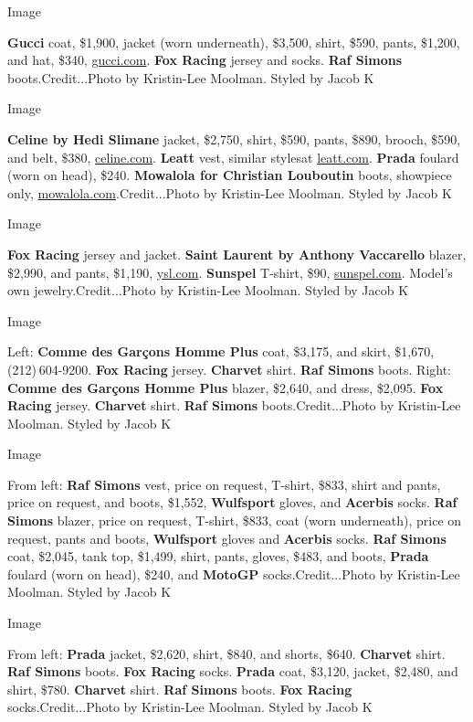 Image

\textbf{Gucci} coat, \$1,900, jacket (worn underneath), \$3,500, shirt,
\$590, pants, \$1,200, and hat, \$340,
\href{http://gucci.com/}{gucci.com}. \textbf{Fox Racing} jersey and
socks. \textbf{Raf Simons} boots.Credit...Photo by Kristin-Lee Moolman.
Styled by Jacob K

Image

\textbf{Celine by Hedi Slimane} jacket, \$2,750, shirt, \$590, pants,
\$890, brooch, \$590, and belt, \$380,
\href{http://celine.com/}{celine.com}. \textbf{Leatt} vest, similar
stylesat \href{http://leatt.com/}{leatt.com}. \textbf{Prada} foulard
(worn on head), \$240. \textbf{Mowalola for Christian Louboutin} boots,
showpiece only, \href{http://mowalola.com/}{mowalola.com}.Credit...Photo
by Kristin-Lee Moolman. Styled by Jacob K

Image

\textbf{Fox Racing} jersey and jacket. \textbf{Saint Laurent by Anthony
Vaccarello} blazer, \$2,990, and pants, \$1,190,
\href{http://ysl.com/}{ysl.com}. \textbf{Sunspel} T-shirt, \$90,
\href{http://sunspel.com/}{sunspel.com}. Model's own
jewelry.Credit...Photo by Kristin-Lee Moolman. Styled by Jacob K

Image

Left: \textbf{Comme des Garçons Homme Plus} coat, \$3,175, and skirt,
\$1,670, (212) 604-9200. \textbf{Fox Racing} jersey. \textbf{Charvet}
shirt. \textbf{Raf Simons} boots. Right: \textbf{Comme des Garçons Homme
Plus} blazer, \$2,640, and dress, \$2,095. \textbf{Fox Racing} jersey.
\textbf{Charvet} shirt. \textbf{Raf Simons} boots.Credit...Photo by
Kristin-Lee Moolman. Styled by Jacob K

Image

From left: \textbf{Raf Simons} vest, price on request, T-shirt, \$833,
shirt and pants, price on request, and boots, \$1,552,
\textbf{Wulfsport} gloves, and \textbf{Acerbis} socks. \textbf{Raf
Simons} blazer, price on request, T-shirt, \$833, coat (worn
underneath), price on request, pants and boots, \textbf{Wulfsport}
gloves and \textbf{Acerbis} socks. \textbf{Raf Simons} coat, \$2,045,
tank top, \$1,499, shirt, pants, gloves, \$483, and boots,
\textbf{Prada} foulard (worn on head), \$240, and \textbf{MotoGP}
socks.Credit...Photo by Kristin-Lee Moolman. Styled by Jacob K

Image

From left: \textbf{Prada} jacket, \$2,620, shirt, \$840, and shorts,
\$640. \textbf{Charvet} shirt. \textbf{Raf Simons} boots. \textbf{Fox
Racing} socks. \textbf{Prada} coat, \$3,120, jacket, \$2,480, and shirt,
\$780. \textbf{Charvet} shirt. \textbf{Raf Simons} boots. \textbf{Fox
Racing} socks.Credit...Photo by Kristin-Lee Moolman. Styled by Jacob K

